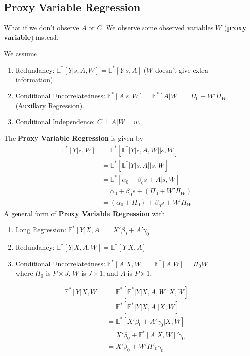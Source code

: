 \documentclass[11pt]{elegantbook}
\begin{document}
\subsection{Proxy Variable Regression}
What if we don't observe $A$ or $C$. We observe some observed variables $W$ (\textbf{proxy variable}) instead.
\begin{assumption}
    We assume
    \begin{enumerate}
        \item Redundancy: $\mathbb{E}^*[Y|s,A,W]=\mathbb{E}^*[Y|s,A]$ ($W$ doesn't give extra information).
        \item Conditional Uncorrelatedness: $\mathbb{E}^*[A|s,W]=\mathbb{E}^*[A|W]=\Pi_0+W'\Pi_W$ (Auxillary Regression).
        \item Conditional Independence: $C\perp A | W=w$.
    \end{enumerate}
\end{assumption}
The \textbf{Proxy Variable Regression} is given by
\begin{equation}
    \begin{aligned}
        \mathbb{E}^*[Y|s,W]&=\mathbb{E}^*\left[\mathbb{E}^*[Y|s,A,W]|s,W\right]\\
        &=\mathbb{E}^*\left[\mathbb{E}^*[Y|s,A]|s,W\right]\\
        &=\mathbb{E}^*[\alpha_0+\beta_0s+A|s,W]\\
        &=\alpha_0+\beta_0s+(\Pi_0+W'\Pi_W)\\
        &=(\alpha_0+\Pi_0)+\beta_0 s+ W'\Pi_W
    \end{aligned}
    \tag{PVR}
    \label{PVR}
\end{equation}
A \underline{general form} of \textbf{Proxy Variable Regression} with
\begin{enumerate}
    \item Long Regression: $\mathbb{E}^*[Y|X,A]=X'\beta_0+A'\gamma_0$
    \item Redundancy: $\mathbb{E}^*[Y|X,A,W]=\mathbb{E}^*[Y|X,A]$
    \item Conditional Uncorrelatedness: $\mathbb{E}^*[A|X,W]=\mathbb{E}^*[A|W]=\Pi_0 W$\\
    where $\Pi_0$ is $P\times J$, $W$ is $J\times 1$, and $A$ is $P\times 1$.
\end{enumerate}
\begin{equation}
    \begin{aligned}
        \mathbb{E}^*[Y|X,W]&=\mathbb{E}^*\left[\mathbb{E}^*[Y|X,A,W]|X,W\right]\\
        &=\mathbb{E}^*\left[\mathbb{E}^*[Y|X,A]|X,W\right]\\
        &=\mathbb{E}^*\left[X'\beta_0+A'\gamma_0|X,W\right]\\
        &=X'\beta_0+\mathbb{E}^*[A|X,W]'\gamma_0\\
        &=X'\beta_0+W'\Pi'_0\gamma_0
    \end{aligned}
    \nonumber
\end{equation}
\end{document}
